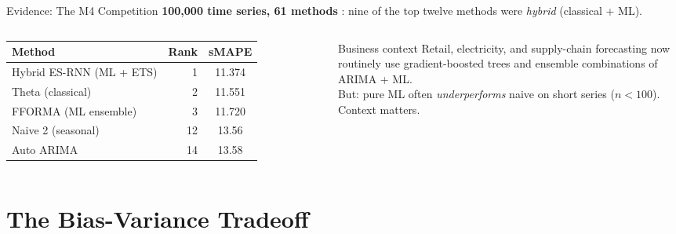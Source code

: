 \documentclass[aspectratio=169, 11pt]{beamer}
\begin{document}
\begin{frame}{Evidence: The M4 Competition}
  \textbf{100{,}000 time series, 61 methods} \parencite{Makridakis2020}:
  nine of the top twelve methods were \emph{hybrid} (classical + ML).
  \begin{columns}[T]
      {\footnotesize
      \begin{tabular}{lrc}
        \toprule
        \textbf{Method} & \textbf{Rank} & \textbf{sMAPE} \\
        \midrule
        Hybrid ES-RNN (ML + ETS)  & 1  & 11.374 \\
        Theta (classical)         & 2  & 11.551 \\
        FFORMA (ML ensemble)      & 3  & 11.720 \\
        Naive 2 (seasonal)        & 12 & 13.56 \\
        Auto ARIMA                & 14 & 13.58 \\
        \bottomrule
      \end{tabular}
      }
      \begin{examplebox}{Business context}
        {\small Retail, electricity, and supply-chain
        forecasting now routinely use gradient-boosted
        trees and ensemble combinations of ARIMA + ML.\\[3pt]
        But: pure ML often \emph{underperforms} naive on
        short series ($n < 100$). Context matters.}
      \end{examplebox}
  \end{columns}
\end{frame}

\section{The Bias-Variance Tradeoff}

\end{document}

